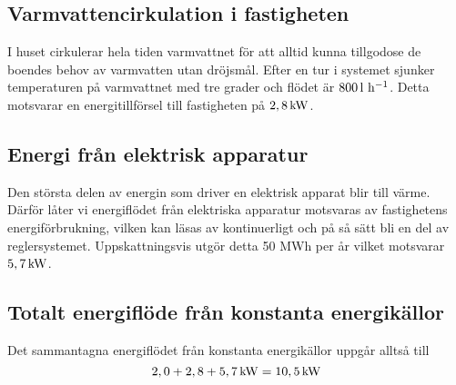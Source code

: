 \subsection{Varmvattencirkulation i fastigheten}
I huset cirkulerar hela tiden varmvattnet för att alltid kunna tillgodose de boendes behov av varmvatten utan dröjsmål. Efter en tur i systemet sjunker temperaturen på varmvattnet med tre grader och flödet är $\unit[800]{l~h^{-1}}$. Detta motsvarar en energitillförsel till fastigheten på $\unit[2,8]{kW}$.

\subsection{Energi från elektrisk apparatur}
Den största delen av energin som driver en elektrisk apparat blir till värme. Därför låter vi energiflödet från elektriska apparatur motsvaras av fastighetens energiförbrukning, vilken kan läsas av kontinuerligt och på så sätt bli en del av reglersystemet. Uppskattningsvis utgör detta 50 MWh per år vilket motsvarar $\unit[5,7]{kW}$.

\subsection{Totalt energiflöde från konstanta energikällor}
Det sammantagna energiflödet från konstanta energikällor uppgår alltså till 
\begin{equation}
\unit[2,0+2,8+5,7]{kW} =\unit[10,5]{kW}
\end{equation}



